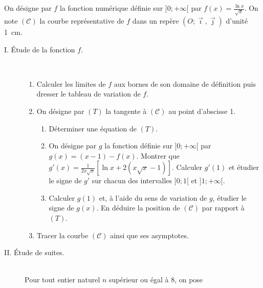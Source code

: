 \begin{exo}
      On d\'esigne par $f$ la fonction num\'erique d\'efinie sur $]0 ; +\infty[$ par $f(x) = \frac{\ln x}{\sqrt{x}}$.
      On note $(\mathscr{C})$ la courbe repr\'esentative de $f$ dans un rep\`ere
      $(O;\vec{\imath},\vec{\jmath})$ d'unit\'e 1~cm.
      \begin{description}
            \item[I. \'Etude de la fonction $f$.] ~\\[-1.5\baselineskip]
            \begin{enumerate}
                  \item Calculer les limites de $f$ aux bornes de son domaine de d\'efinition
                        puis dresser le tableau de variation de $f$.
                  \item On d\'esigne par $(T)$ la tangente \`a $(\mathscr{C})$ au point d'abscisse 1.
                        \begin{enumerate}
                              \item D\'eterminer une \'equation de $(T)$.
                              \item On d\'esigne par $g$ la fonction d\'efinie sur $]0;+\infty[$ par 
                                    $g(x) = (x-1) - f(x)$.
                                    Montrer que 
                                    $g'(x) = \displaystyle{
                                          \frac{1}{2x\sqrt{x}}
                                                \left[
                                                      \ln x + 2 \left( x \sqrt{x} - 1 \right)
                                                \right]
                                          }$.
                                    Calculer $g'(1)$ et \'etudier le signe de $g'$ sur chacun des intervalles
                                    $]0;1[$ et $]1;+\infty[$.
                              \item Calculer $g(1)$ et, \`a l'aide du sens de variation de $g$, \'etudier le signe de $g(x)$.
                                    En d\'eduire la position de $(\mathscr{C})$ par rapport \`a $(T)$.
                        \end{enumerate}
                  \item Tracer la courbe $(\mathscr{C})$ ainsi que ses asymptotes.
            \end{enumerate}
            \item[II. \'Etude de suites.] ~\\
            Pour tout entier naturel $n$ sup\'erieur ou \'egal \`a $8$, on pose

\end{description}
\end{exo}
